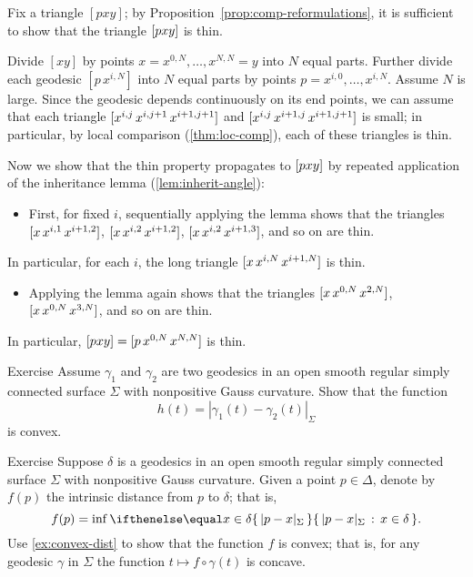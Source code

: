 Fix a triangle $[p x y]$; 
by Proposition~\ref{prop:comp-reformulations}, it is sufficient to show that the triangle $[p{x}{y}]$ is thin.   

Divide $[xy]$ by points $x=x^{0,N},\dots,x^{N,N}=y$ into $N$ equal parts.
Further divide each geodesic $[p\,x^{i,N}]$ into $N$ equal parts by points $p=x^{i,0},\dots,x^{i,N}$.
Assume $N$ is large.
Since the geodesic depends continuously on its end points, we can assume that each triangle 
 $[x^{i,j}{\,x^{i,j+1}}{\,x^{i+1,j+1}}]$ and $[x^{i,j}{\,x^{i+1,j}}{\,x^{i+1,j+1}}]$ is small;
 in particular, by local comparison (\ref{thm:loc-comp}), each of these triangles is thin. 

Now we show that the thin property propagates to $[p{x}{y}]$ by repeated application of the inheritance lemma (\ref{lem:inherit-angle}):
\begin{itemize}
\item 
First, for fixed $i$, 
sequentially applying the lemma shows  that the triangles 
$[x{\,x^{i,1}}{\,x^{i+1,2}}]$, 
$[x{\,x^{i,2}}{\,x^{i+1,2}}]$, 
$[x{\,x^{i,2}}{\,x^{i+1,3}}]$,
and so on are thin. 
\end{itemize}
In particular, for each $i$, the long triangle $[x{\,x^{i,N}}{\,x^{i+1,N}}]$ is thin.
\begin{itemize} 
\item 
Applying the lemma again shows that the  triangles $[x{\,x^{0,N}}{\,x^{2,N}}]$, $[x{\,x^{0,N}}{\,x^{3,N}}]$, and so on are thin. 
\end{itemize}
In particular, $[p{x}{y}]=[p{\,x^{0,N}}{\,x^{N,N}}]$ is thin.
\qeds


\begin{thm}{Exercise}\label{ex:convex-dist}
Assume $\gamma_1$ and $\gamma_2$ are two geodesics in an open smooth regular simply connected surface $\Sigma$ with nonpositive Gauss curvature.
Show that the function
\[h(t)=|\gamma_1(t)-\gamma_2(t)|_\Sigma\]
is convex.
\end{thm}

\begin{thm}{Exercise}\label{ex:convex-dist+}
Suppose $\delta$ is a geodesics in an open smooth regular simply connected surface $\Sigma$ with nonpositive Gauss curvature.
Given a point $p\in\Delta$, denote by $f(p)$ the intrinsic distance from $p$ to $\delta$;
that is,
\[f(p)=\inf\set{|p-x|_\Sigma}{x\in\delta}.\]
Use \ref{ex:convex-dist} to show that the function $f$ is convex;
that is, for any geodesic $\gamma$ in $\Sigma$ the function $t\mapsto f\circ\gamma(t)$ is concave.
\end{thm}


